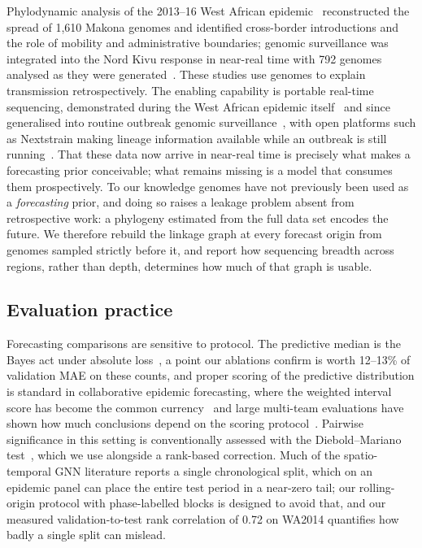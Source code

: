 Phylodynamic analysis of the 2013--16 West African epidemic~\cite{dudas2017} reconstructed the spread of 1{,}610 Makona genomes and identified cross-border introductions and the role of mobility and administrative boundaries; genomic surveillance was integrated into the Nord Kivu response in near-real time with 792 genomes analysed as they were generated~\cite{kinganda2021}. These studies use genomes to explain transmission retrospectively. The enabling capability is portable real-time sequencing, demonstrated during the West African epidemic itself~\cite{quick2016} and since generalised into routine outbreak genomic surveillance~\cite{grubaugh2019}, with open platforms such as Nextstrain making lineage information available while an outbreak is still running~\cite{hadfield2018}. That these data now arrive in near-real time is precisely what makes a forecasting prior conceivable; what remains missing is a model that consumes them prospectively. To our knowledge genomes have not previously been used as a \emph{forecasting} prior, and doing so raises a leakage problem absent from retrospective work: a phylogeny estimated from the full data set encodes the future. We therefore rebuild the linkage graph at every forecast origin from genomes sampled strictly before it, and report how sequencing breadth across regions, rather than depth, determines how much of that graph is usable.

\subsection{Evaluation practice}

Forecasting comparisons are sensitive to protocol. The predictive median is the Bayes act under absolute loss~\cite{gneiting2011}, a point our ablations confirm is worth 12--13\% of validation MAE on these counts, and proper scoring of the predictive distribution is standard in collaborative epidemic forecasting, where the weighted interval score has become the common currency~\cite{bracher2021} and large multi-team evaluations have shown how much conclusions depend on the scoring protocol~\cite{cramer2022}. Pairwise significance in this setting is conventionally assessed with the Diebold--Mariano test~\cite{diebold1995}, which we use alongside a rank-based correction. Much of the spatio-temporal GNN literature reports a single chronological split, which on an epidemic panel can place the entire test period in a near-zero tail; our rolling-origin protocol with phase-labelled blocks is designed to avoid that, and our measured validation-to-test rank correlation of 0.72 on WA2014 quantifies how badly a single split can mislead.
